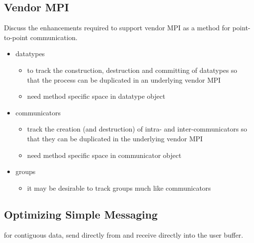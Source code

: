 
\subsection{Vendor MPI}

Discuss the enhancements required to support vendor MPI as a method for
point-to-point communication.
\begin{itemize}
\item datatypes
  \begin{itemize}
  \item to track the construction, destruction and committing of datatypes so
    that the process can be duplicated in an underlying vendor MPI
  \item need method specific space in datatype object 
  \end{itemize}
\item communicators
  \begin{itemize}
  \item track the creation (and destruction) of intra- and inter-communicators
    so that they can be duplicated in the underlying vendor MPI
  \item need method specific space in communicator object 
  \end{itemize}
\item groups
  \begin{itemize}
  \item it may be desirable to track groups much like communicators
  \end{itemize}
\end{itemize}


\subsection{Optimizing Simple Messaging}


for contiguous data, send directly from and receive directly into the
user buffer.

